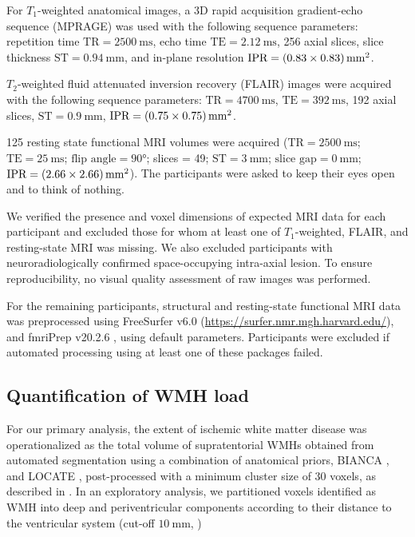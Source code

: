 For $T_1$-weighted anatomical images, a 3D rapid acquisition gradient-echo sequence (MPRAGE) was used with the following sequence parameters: repetition time $\text{TR} = \qty{2500}{\ms}$, echo time $\text{TE} = \qty{2.12}{\ms}$, 256 axial slices, slice thickness $\text{ST} = \qty{0.94}{\mm}$, and in-plane resolution  $\text{IPR} = \qtyproduct[product-units = bracket-power]{0.83 x 0.83}{\mm}$.

$T_2$-weighted fluid attenuated inversion recovery (FLAIR) images were acquired with the following sequence parameters: $\text{TR} = \qty{4700}{\ms}$, $\text{TE} = \qty{392}{\ms}$, \num{192} axial slices, $\text{ST} = \qty{0.9}{\mm}$, $\text{IPR} = \qtyproduct[product-units = bracket-power]{0.75 x 0.75}{\mm}$.

\num{125} resting state functional MRI volumes were acquired ($\text{TR} = \qty{2500}{\ms}$; $\text{TE} = \qty{25}{\ms}$; $\text{flip angle} = \ang[]{90}$; slices = \num{49}; $\text{ST} = \qty{3}{\mm}$; $\text{slice gap} = \qty{0}{\mm}$; $\text{IPR} = \qtyproduct[product-units = bracket-power]{2.66 x 2.66}{\mm}$).
The participants were asked to keep their eyes open and to think of nothing.

We verified the presence and voxel dimensions of expected MRI data for each participant and excluded those for whom at least one of $T_1$-weighted, FLAIR, and resting-state MRI was missing. We also excluded participants with neuroradiologically confirmed space-occupying intra-axial lesion.
To ensure reproducibility, no visual quality assessment of raw images was performed.

For the remaining participants, structural and resting-state functional MRI data was preprocessed using FreeSurfer v6.0 (\url{https://surfer.nmr.mgh.harvard.edu/}), and fmriPrep v20.2.6 \citep{Esteban2019-sx}, using default parameters. Participants were excluded if automated processing using at least one of these packages failed.

\subsection{Quantification of WMH load}
For our primary analysis, the extent of ischemic white matter disease was operationalized as the total volume of supratentorial WMHs obtained from automated segmentation using a combination of anatomical priors, BIANCA \citep{Griffanti2016-dt}, and LOCATE \citep{Sundaresan2019-ww}, post-processed with a minimum cluster size of \num{30} voxels, as described in \citep{Schlemm2022-he}.
In an exploratory analysis, we partitioned voxels identified as WMH into deep and periventricular components according to their distance to the ventricular system (cut-off $\qty{10}{\mm}$, \citep{Griffanti2018-oa})

